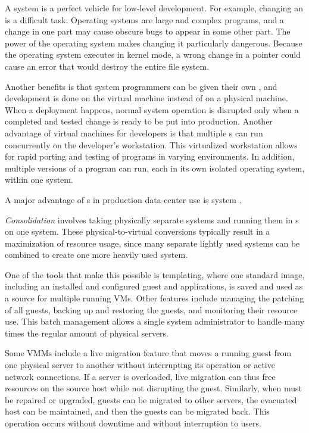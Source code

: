 A  system is a perfect vehicle for low-level development.
For example, changing an  is a difficult task.
Operating systems are large and complex programs, and a change in one part may cause obscure bugs to appear in some other part.
The power of the operating system makes changing it particularly dangerous.
Because the operating system executes in kernel mode, a wrong change in a pointer could cause an error that would destroy the entire file system.

Another benefits is that system programmers can be given their own , and development is done on the virtual machine instead of on a physical machine.
When a deployment happens, normal system operation is disrupted only when a completed and tested change is ready to be put into production.
Another advantage of virtual machines for developers is that multiple s can run concurrently on the developer’s workstation.
This virtualized workstation allows for rapid porting and testing of programs in varying environments.
In addition, multiple versions of a program can run, each in its own isolated operating system, within one system.

A major advantage of s in production data-center use is system .

\begin{definition}[Consolidation]\label{def:Consolidation}
  \emph{Consolidation} involves taking physically separate systems and running them in s on one system.
  These physical-to-virtual conversions typically result in a maximization of resource usage, since many separate lightly used systems can be combined to create one more heavily used system.
\end{definition}

One of the tools that make this possible is templating, where one standard  image, including an
installed and configured guest  and applications, is saved and used as a source for multiple running VMs.
Other features include managing the patching of all guests, backing up and restoring the guests, and monitoring their resource use.
This batch management allows a single system administrator to handle many times the regular amount of physical servers.

Some VMMs include a live migration feature that moves a running guest from one physical server to another without interrupting its operation or active network connections.
If a server is overloaded, live migration can thus free resources on the source host while not disrupting the guest.
Similarly, when   must be repaired or upgraded, guests can be migrated to other servers, the evacuated host can be maintained, and then the guests can be migrated back.
This operation occurs without downtime and without interruption to users.

